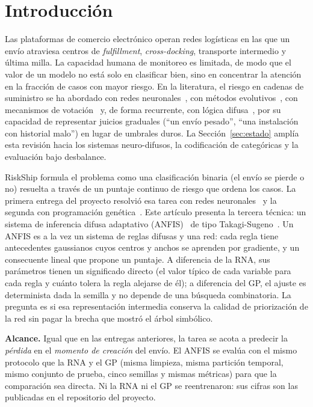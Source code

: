 \documentclass[conference]{IEEEtran}
\begin{document}
\section{Introducción}

Las plataformas de comercio electrónico operan redes logísticas en las que un
envío atraviesa centros de \textit{fulfillment}, \textit{cross-docking},
transporte intermedio y última milla. La capacidad humana de monitoreo es
limitada, de modo que el valor de un modelo no está solo en clasificar bien,
sino en concentrar la atención en la fracción de casos con mayor riesgo. En la
literatura, el riesgo en cadenas de suministro se ha abordado con redes
neuronales~\cite{bortolini,ye}, con métodos evolutivos~\cite{nezamoddini},
con mecanismos de votación~\cite{ifac2022} y, de forma recurrente, con lógica
difusa~\cite{gajovic,aqlan}, por su capacidad de representar juicios
graduales (``un envío pesado'', ``una instalación con historial malo'') en
lugar de umbrales duros. La Sección~\ref{sec:estado} amplía esta revisión
hacia los sistemas neuro-difusos, la codificación de categóricas y la
evaluación bajo desbalance.

RiskShip formula el problema como una clasificación binaria (el envío se
pierde o no) resuelta a través de un puntaje continuo de riesgo que ordena los
casos. La primera entrega del proyecto resolvió esa tarea con redes
neuronales~\cite{informe_rna} y la segunda con programación
genética~\cite{paper_gp}. Este artículo presenta la tercera técnica: un
sistema de inferencia difusa adaptativo (ANFIS)~\cite{jang} de tipo
Takagi-Sugeno~\cite{takagi}. Un ANFIS es a la vez un sistema de reglas
difusas y una red: cada regla tiene antecedentes gaussianos cuyos centros y
anchos se aprenden por gradiente, y un consecuente lineal que propone un
puntaje. A diferencia de la RNA, sus parámetros tienen un significado directo
(el valor típico de cada variable para cada regla y cuánto tolera la regla
alejarse de él); a diferencia del GP, el ajuste es determinista dada la
semilla y no depende de una búsqueda combinatoria. La pregunta es si esa
representación intermedia conserva la calidad de priorización de la red sin
pagar la brecha que mostró el árbol simbólico.

\textbf{Alcance.} Igual que en las entregas anteriores, la tarea se acota a
predecir la \emph{pérdida} en el \emph{momento de creación} del envío. El
ANFIS se evalúa con el mismo protocolo que la RNA y el GP (misma limpieza,
misma partición temporal, mismo conjunto de prueba, cinco semillas y mismas
métricas) para que la comparación sea directa. Ni la RNA ni el GP se
reentrenaron: sus cifras son las publicadas en el repositorio del proyecto.
\end{document}

